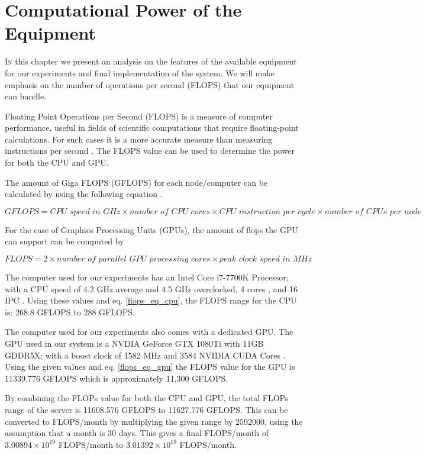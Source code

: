 \section{Computational Power of the Equipment}

\lettrine[nindent=0em,lines=3]{I}n this chapter we present an analysis on the features of the available equipment for our experiments and final implementation of the system. We will make emphasis on the number of operations per second (FLOPS) that our equipment can handle.

Floating Point Operations per Second (FLOPS) is a measure of computer performance, useful in fields of scientific computations that require floating-point calculations. For such cases it is a more accurate measure than measuring instructions per second \cite{flops_wikipedia}. The FLOPS value can be used to determine the power for both the CPU and GPU.

The amount of Giga FLOPS (GFLOPS) for each node/computer can be calculated by using the following equation \cite{peak_theoretical_performance}.

\begin{equation}
GFLOPS = \textit{CPU speed in GHz} \times \textit{number of CPU cores} \times \textit{CPU instruction per cycle} \times \textit{number of CPUs per node} 
\label{flops_eq_cpu}
\end{equation}

For the case of Graphics Processing Units (GPUs), the amount of flops the GPU can support can be computed by \cite{gpu_flops}

\begin{equation}
FLOPS = 2 \times \textit{number of parallel GPU processing cores} \times \textit{peak clock speed in MHz}
\label{flops_eq_gpu}
\end{equation}

The computer used for our experiments has an Intel Core i7-7700K Processor; with a CPU speed of 4.2 GHz average and 4.5 GHz overclocked, 4 cores \cite{cpu_tech_specs}, and 16 IPC \cite{determine_number_flops_cpu}.  Using these values and eq. \eqref{flops_eq_cpu}, the FLOPS range for the CPU is: 268.8 GFLOPS to 288 GFLOPS.
    
The computer used for our experiments also comes with a dedicated GPU. The GPU used in our system is a NVDIA GeForce GTX 1080Ti with 11GB GDDR5X; with a boost clock of 1582 MHz and 3584 NVIDIA CUDA Cores \cite{gpu_tech_specs}. Using the given values and eq. \eqref{flops_eq_gpu} the FLOPS value for the GPU is 11339.776 GFLOPS which is approximately 11,300 GFLOPS.

By combining the FLOPs value for both the CPU and GPU, the total FLOPs range of the server is 11608.576 GFLOPS to 11627.776 GFLOPS. This can be converted to FLOPS/month by multiplying the given range by $2592000$, using the assumption that a month is 30 days. This gives a final FLOPS/month of $3.00894 \times 10^{19}$ FLOPS/month to $3.01392 \times 10^{19}$ FLOPS/month.
